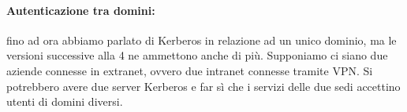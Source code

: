 \paragraph{Autenticazione tra domini:} fino ad ora abbiamo parlato di Kerberos
in relazione ad un unico dominio, ma le versioni successive alla 4 ne ammettono
anche di più. Supponiamo ci siano due aziende connesse in extranet, ovvero due
intranet connesse tramite VPN. Si potrebbero avere due server Kerberos e far sì
che i servizi delle due sedi accettino utenti di domini diversi.